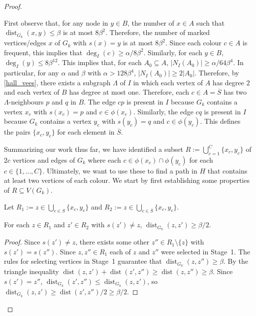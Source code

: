 \documentclass{patmorin}
\DeclareMathOperator{\dist}{dist}
\begin{document}
\begin{proof}
\begin{compactenum}[{Stage} 1.]
    First observe that, for any node in $y\in B$, the number of $x\in A$ such that $\dist_{G_k}(x,y) \le \beta$ is at most $8\beta^2$.   Therefore, the number of marked vertices/edges $x$ of $G_k$ with $s(x)=y$ is at most $8\beta^2$.  Since each colour $c\in A$ is frequent, this implies that $\deg_I(c)\ge \alpha/8\beta^2$.  Similarly, for each $y\in B$,  $\deg_{I}(y) \le 8\beta^12$.  This implies that, for each $A_0\subseteq A$, $|N_I(A_0)|\ge \alpha/64\beta^4$.   In particular, for any $\alpha$ and $\beta$ with $\alpha > 128\beta^4$,  $|N_I(A_0)|\ge 2|A_0|$.  Therefore, by \cref{hall_vees}, there exists a subgraph $\Lambda$ of $I$ in which each vertex of $A$ has degree $2$ and each vertex of $B$ has degree at most one.  Therefore, each $c\in A=\overline{S}$ has two $\Lambda$-neighbours $p$ and $q$ in $B$.  The edge $cp$ is present in $I$ because $G_k$ contains a vertex $x_c$ with $s(x_c)=p$ and $c\in \phi(x_c)$.  Similarly, the edge $cq$ is present in $I$ because $G_k$ contains a vertex $y_c$ with $s(y_c)=q$ and $c\in\phi(y_c)$.  This defines the pairs $\{x_c,y_c\}$ for each element in $\overline{S}$.
  \end{compactenum}

  Summarizing our work thus far, we have identified a subset  $R:=\bigcup_{c=1}^C\{x_c,y_c\}$ of $2c$ vertices and edges of $G_k$ where each $c\in \phi(x_c)\cap \phi(y_c)$ for each $c\in\{1,\ldots,C\}$. Ultimately, we want to use these to find a path in $H$ that contains at least two vertices of each colour.  We start by first establishing some properties of $R\subseteq V(G_k)$. 
  
  Let $R_1:=z\in\bigcup_{c\in S}\{x_c,y_c\}$ and $R_2:=z\in\bigcup_{c\in \overline{S}}\{x_c,y_c\}$.
  
  \begin{clm}\label{far_from_home}
    For each $z\in R_1$ and $z'\in R_2$ with $s(z')\neq z$, $\dist_{G_k}(z,z')\ge \beta /2$.
  \end{clm}
  
  \begin{proof}
    Since $s(z')\neq z$, there exists some other $z''\in R_1\setminus\{z\}$ with $s(z')=s(z'')$.  Since $z,z''\in R_1$ each of $z$ and $z''$ were selected in Stage~1.  The rules for selecting vertices in Stage~1 guarantee that $\dist_{G_k}(z,z'')\ge \beta$.  By the triangle inequality $\dist(z, z')+\dist(z',z'') \ge \dist(z,z'')\ge \beta$.  Since $s(z')=z''$, $\dist_{G_k}(z', z'') \le \dist_{G_k}(z, z')$, so $\dist_{G_k}(z,z') \ge \dist(z',z'')/2 \ge \beta/2$.
  \end{proof}
  

\end{proof}
\end{document}

